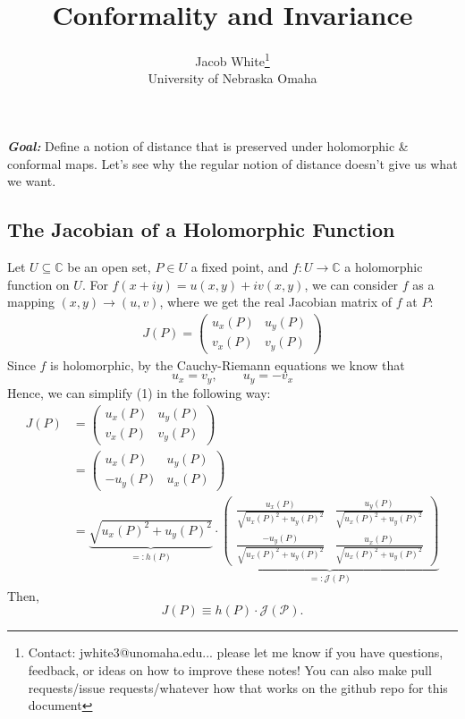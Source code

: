 \documentclass[10pt]{article}
\title{\textbf{Conformality and Invariance}}
\date{}
\author{Jacob White\footnote{Contact: jwhite3@unomaha.edu... please let me know if you have questions, feedback, or ideas on how to improve these notes! You can also make pull requests/issue requests/whatever how that works on the github repo for this document} \\ University of Nebraska Omaha}
\theoremstyle{plain}
\begin{document}
	\maketitle 
	
\noindent \textbf{\textit{Goal:}} Define a notion of distance that is preserved under holomorphic \& conformal maps. Let's see why the regular notion of distance doesn't give us what we want.



\subsection*{The Jacobian of a Holomorphic Function}


Let $U \subseteq \mathbb{C}$ be an open set, $P \in U$ a fixed point, and $f: U \to \mathbb{C}$ a holomorphic function on $U$. For $f(x + iy) = u(x, y) + iv(x,y)$, we can consider $f$ as a mapping $(x, y) \to (u, v)$, where we get the real Jacobian matrix of $f$ at $P$: 
	\begin{eqnarray}
		J(P) = \begin{pmatrix}u_x(P) & u_y(P) \\ v_x(P) & v_y(P)\end{pmatrix}
	\end{eqnarray}
Since $f$ is holomorphic, by the Cauchy-Riemann equations we know that
	\begin{equation}
		\boxed{u_x = v_y, \qquad u_y = -v_x}
	\end{equation}
Hence, we can simplify (1) in the following way:
	\begin{align*}
		J(P) &=  \begin{pmatrix}u_x(P) & u_y(P) \\ v_x(P) & v_y(P)\end{pmatrix} \\
		&= \begin{pmatrix}u_x(P) & u_y(P) \\ -u_y(P) & u_x(P)\end{pmatrix} \\
		&= \underbrace{\sqrt{u_x(P)^2 + u_y(P)^2}}_{=: h(P)} \cdot \underbrace{ \begin{pmatrix} \frac{u_x(P)}{\sqrt{u_x(P)^2 + u_y(P)^2}} & \frac{u_y(P)}{\sqrt{u_x(P)^2 + u_y(P)^2}} \\ \frac{-u_y(P)}{\sqrt{u_x(P)^2 + u_y(P)^2}} & \frac{u_x(P)}{\sqrt{u_x(P)^2 + u_y(P)^2}} \end{pmatrix}} _{=: \mathcal{J}(P)}
	\end{align*}
Then, 
	\begin{equation}
		J(P) \equiv h(P) \cdot \mathcal{J(P)}.
	\end{equation}
\end{document}
